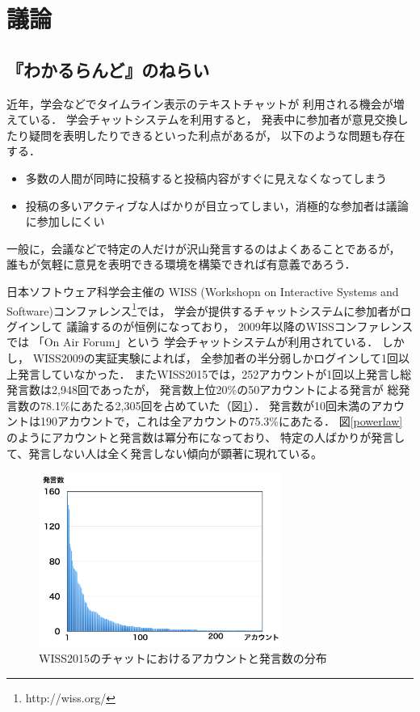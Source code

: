 \section{議論}

\subsection{『わかるらんど』のねらい}

近年，学会などでタイムライン表示のテキストチャットが
利用される機会が増えている\cite{goto2012}．
学会チャットシステムを利用すると，
発表中に参加者が意見交換したり疑問を表明したりできるといった利点があるが，
以下のような問題も存在する．

\begin{itemize}
\item 多数の人間が同時に投稿すると投稿内容がすぐに見えなくなってしまう
\item 投稿の多いアクティブな人ばかりが目立ってしまい，消極的な参加者は議論に参加しにくい
\end{itemize}

一般に，会議などで特定の人だけが沢山発言するのはよくあることであるが，
誰もが気軽に意見を表明できる環境を構築できれば有意義であろう．

日本ソフトウェア科学会主催の
WISS (Workshopn on Interactive Systems and Software)コンファレンス\footnote{
  \textsf{http://wiss.org/}
}では，
学会が提供するチャットシステムに参加者がログインして
議論するのが恒例になっており\cite{wiss_challenge}，
2009年以降のWISSコンファレンスでは
「On Air Forum」\cite{nishida2011}という
学会チャットシステムが利用されている．
%
しかし，
WISS2009の実証実験によれば，
全参加者の半分弱しかログインして1回以上発言していなかった．
またWISS2015では，252アカウントが1回以上発言し総発言数は2,948回であったが，
発言数上位20\%の50アカウントによる発言が
総発言数の78.1\%にあたる2,305回を占めていた（図\ref{wisschat}）．
発言数が10回未満のアカウントは190アカウントで，これは全アカウントの75.3\%にあたる．
図\ref{powerlaw}のようにアカウントと発言数は冪分布になっており、
特定の人ばかりが発言して、発言しない人は全く発言しない傾向が顕著に現れている。

\begin{figure}[h]
\centering\includegraphics[width=8cm]{images/wisschat.png}
\caption{WISS2015のチャットにおけるアカウントと発言数の分布}
\label{wisschat}
\end{figure}

